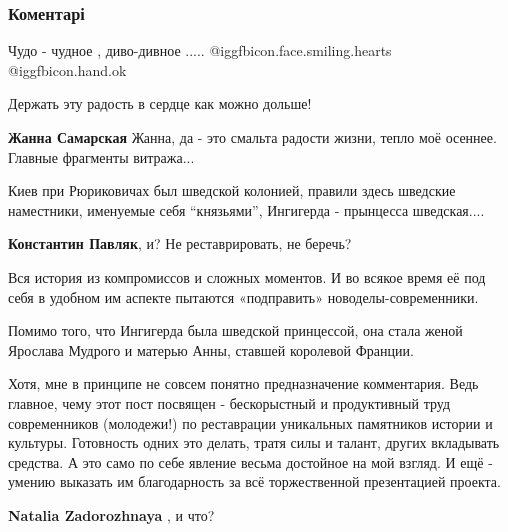  
 
 
 
 
\subsubsection{Коментарі}

\begin{itemize} %
Чудо - чудное , диво-дивное ..... @igg{fbicon.face.smiling.hearts}  @igg{fbicon.hand.ok} 

Держать эту радость в сердце как можно дольше!

\begin{itemize} %
\textbf{Жанна Самарская}
Жанна, да - это смальта радости жизни, тепло моё осеннее. Главные фрагменты витража...
\end{itemize} %


Киев при Рюриковичах был шведской колонией, правили здесь шведские наместники, именуемые себя \enquote{князьями},
Ингигерда - прынцесса шведская....

\begin{itemize} %
\textbf{Константин Павляк}, и? Не реставрировать, не беречь?

Вся история из компромиссов и сложных моментов. И во всякое время её под себя в
удобном им аспекте пытаются «подправить» новоделы-современники.

Помимо того, что Ингигерда была шведской принцессой, она стала женой Ярослава
Мудрого и матерью Анны, ставшей королевой Франции.

Хотя, мне в принципе не совсем понятно предназначение комментария. Ведь
главное, чему этот пост посвящен - бескорыстный и продуктивный труд
современников (молодежи!) по реставрации уникальных памятников истории и
культуры. Готовность одних это делать, тратя силы и талант, других вкладывать
средства. А это само по себе явление весьма достойное на мой взгляд. И ещё -
умению выказать им благодарность за всё торжественной презентацией проекта.


\textbf{Natalia Zadorozhnaya} , и что?


\end{itemize}
\end{itemize}
